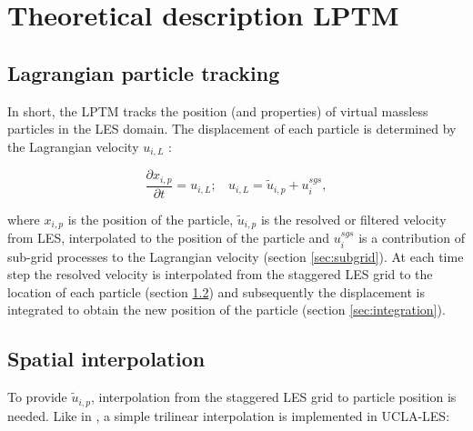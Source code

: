\documentclass[twoside,a4paper]{report}
\begin{document}
\chapter{Theoretical description LPTM}
\label{chap:theory}

\section{Lagrangian particle tracking}

In short, the LPTM tracks the position (and properties) of virtual massless particles in the LES domain. The displacement of each particle is determined by the Lagrangian velocity $u_{i,L}$ \citep[e.g.][hereafter W04]{weil2004}: 

\begin{equation}
 \frac{\partial x_{i,p}}{\partial t} = u_{i,L}; \:\:\:\: u_{i,L} = \widetilde{u}_{i,p} + u_{i}^{sgs},
 \label{eq:xip}
\end{equation}

where $x_{i,p}$ is the position of the particle, $\widetilde{u}_{i,p}$ is the resolved or filtered velocity from LES, interpolated to the position of the particle and $u_{i}^{sgs}$ is a contribution of sub-grid processes to the Lagrangian velocity (section \ref{sec:subgrid}). At each time step the resolved velocity is interpolated from the staggered LES grid to the location of each particle (section \ref{sec:interpolation}) and subsequently the displacement is integrated to obtain the new position of the particle (section \ref{sec:integration}). 

\section{Spatial interpolation}
\label{sec:interpolation}

To provide $\widetilde{u}_{i,p}$, interpolation from the staggered LES grid to particle position is needed. Like in \cite{heus2008}, a simple trilinear interpolation is implemented in UCLA-LES:
\end{document}
